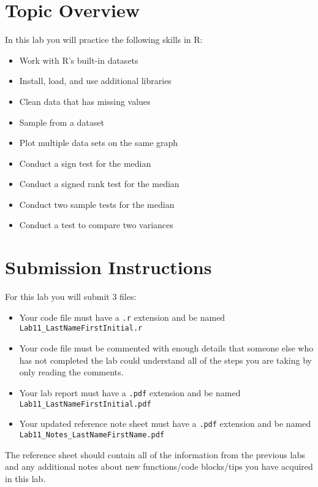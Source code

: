 \documentclass{article}
\begin{document}
\section{Topic Overview}

In this lab you will practice the following skills in R:

\begin{itemize}
    \item Work with R’s built-in datasets
    \item Install, load, and use additional libraries
    \item Clean data that has missing values
    \item Sample from a dataset
    \item Plot multiple data sets on the same graph
    \item Conduct a sign test for the median
    \item Conduct a signed rank test for the median
    \item Conduct two sample tests for the median
    \item Conduct a test to compare two variances
\end{itemize}

\section*{Submission Instructions}

For this lab you will submit 3 files:

\begin{itemize}
    \item Your code file must have a \texttt{.r} extension and be named \texttt{Lab11\_LastNameFirstInitial.r}
    \item Your code file must be commented with enough details that someone else who has not completed the lab could understand all of the steps you are taking by only reading the comments.
    \item Your lab report must have a \texttt{.pdf} extension and be named \texttt{Lab11\_LastNameFirstInitial.pdf}
    \item Your updated reference note sheet must have a \texttt{.pdf} extension and be named \texttt{Lab11\_Notes\_LastNameFirstName.pdf}
\end{itemize}

The reference sheet should contain all of the information from the previous labs and any additional notes about new functions/code blocks/tips you have acquired in this lab.
\end{document}
